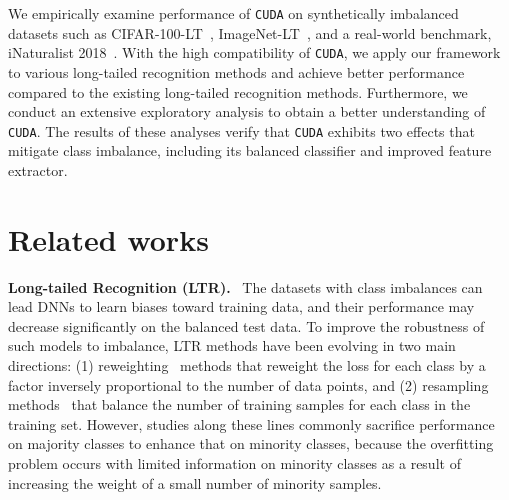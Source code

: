 \documentclass{article}
\newcommand{\myparagraph}[1]{\vspace{0.07cm}\noindent\textbf{#1}~}
\def\code#1{\texttt{#1}}
\newcommand{\alg}{\code{CUDA}\xspace}
\renewcommand*\cite[1]{\citep{#1}}
\begin{document}
We empirically examine performance of \alg on synthetically imbalanced datasets such as CIFAR-100-LT~\cite{cao2019learning}, ImageNet-LT~\cite{liu2019large}, and a real-world benchmark, iNaturalist 2018~\cite{van2018inaturalist}. With the high compatibility of \alg, we apply our framework to various long-tailed recognition methods and achieve better performance compared to the existing long-tailed recognition methods. Furthermore, we conduct an extensive exploratory analysis to obtain a better understanding of \alg. The results of these analyses verify that \alg exhibits two effects that mitigate class imbalance, including its balanced classifier and improved feature extractor.
 \vspace{-10pt}
\section{Related works}
\label{sec:related}
\vspace{-10pt}

\myparagraph{Long-tailed Recognition (LTR).} The datasets with class imbalances can lead DNNs to learn biases toward training data, and their performance may decrease significantly on the balanced test data. To improve the robustness of such models to imbalance, LTR methods have been evolving in two main directions: (1) reweighting~\citep{cui2019class, cao2019learning, park2021influence} methods that reweight the loss for each class by a factor inversely proportional to the number of data points, and (2) resampling methods~\citep{kubat1997addressing, chawla2002smote, ando2017deep} that balance the number of training samples for each class in the training set. However, studies along these lines commonly sacrifice performance on majority classes to enhance that on minority classes, because the overfitting problem occurs with limited information on minority classes as a result of increasing the weight of a small number of minority samples.
\end{document}
